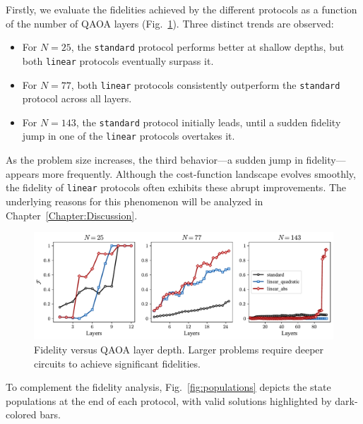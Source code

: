 Firstly, we evaluate the fidelities achieved by the different protocols as a function of the number of QAOA layers (Fig.~\ref{fig:fidelity_layers}). Three distinct trends are observed:  
\begin{itemize}
    \item For $N = 25$, the \texttt{standard} protocol performs better at shallow depths, but both \texttt{linear} protocols eventually surpass it.  
    \item For $N = 77$, both \texttt{linear} protocols consistently outperform the \texttt{standard} protocol across all layers.  
    \item For $N = 143$, the \texttt{standard} protocol initially leads, until a sudden fidelity jump in one of the \texttt{linear} protocols overtakes it.  
\end{itemize}

As the problem size increases, the third behavior---a sudden jump in fidelity---appears more frequently. Although the cost-function landscape evolves smoothly, the fidelity of \texttt{linear} protocols often exhibits these abrupt improvements. The underlying reasons for this phenomenon will be analyzed in Chapter~\ref{Chapter:Discussion}.

\begin{figure}[h]
    \centering
    \includegraphics[width=1\textwidth]{04-results/figs/fidelity_layers_2577143.pdf}
    \caption{Fidelity versus QAOA layer depth. Larger problems require deeper circuits to achieve significant fidelities.}
    \label{fig:fidelity_layers}
\end{figure}

To complement the fidelity analysis, Fig.~\ref{fig:populations} depicts the state populations at the end of each protocol, with valid solutions highlighted by dark-colored bars.

